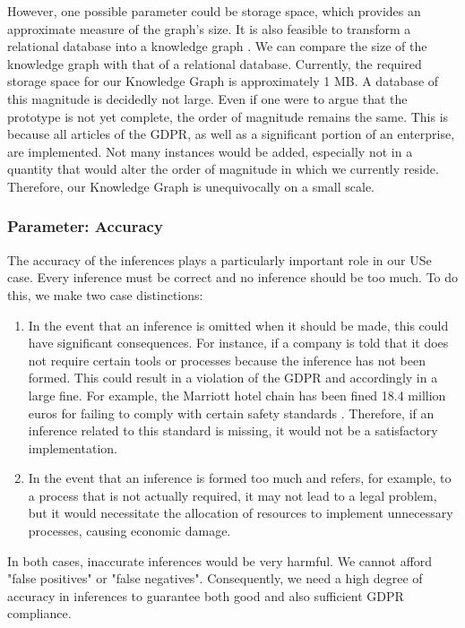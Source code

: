 \documentclass[
  a4paper,  %
  twoside,  %
  bibliography=totoc,
  headsepline,
  cleardoublepage=empty,
  parskip=half,
  draft=false
]{scrbook}
\begin{document}
However, one possible parameter could be storage space, which provides an approximate measure of the graph's size. It is also feasible to transform a relational database into a knowledge graph \cite{Virgilio.2013}. We can compare the size of the knowledge graph with that of a relational database. Currently, the required storage space for our Knowledge Graph is approximately 1 MB. A database of this magnitude is decidedly not large. Even if one were to argue that the prototype is not yet complete, the order of magnitude remains the same. This is because all articles of the \acrlong{GDPR}, as well as a significant portion of an enterprise, are implemented. Not many instances would be added, especially not in a quantity that would alter the order of magnitude in which we currently reside. Therefore, our Knowledge Graph is unequivocally on a small scale.

\subsubsection{Parameter: Accuracy}
The accuracy of the inferences plays a particularly important role in our USe case. Every inference must be correct and no inference should be too much. To do this, we make two case distinctions:\\
\begin{enumerate}
    \item In the event that an inference is omitted when it should be made, this could have significant consequences. For instance, if a company is told that it does not require certain tools or processes because the inference has not been formed. This could result in a violation of the GDPR and accordingly in a large fine. For example, the Marriott hotel chain has been fined 18.4 million euros for failing to comply with certain safety standards \cite{gdpr.2021}. Therefore, if an inference related to this standard is missing, it would not be a satisfactory implementation.
    \item In the event that an inference is formed too much and refers, for example, to a process that is not actually required, it may not lead to a legal problem, but it would necessitate the allocation of resources to implement unnecessary processes, causing economic damage.
\end{enumerate}

In both cases, inaccurate inferences would be very harmful. We cannot afford "false positives" or "false negatives". Consequently, we need a high degree of accuracy in inferences to guarantee both good and also sufficient GDPR compliance.
\end{document}
